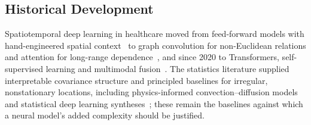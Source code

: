 \documentclass[journal]{IEEEtran}
\begin{document}
\subsection{Historical Development}

Spatiotemporal deep learning in healthcare moved from feed-forward models with hand-engineered spatial context~\cite{miotto2018deeplearning} to graph convolution for non-Euclidean relations and attention for long-range dependence~\cite{caroprese2018deepehr}, and since 2020 to Transformers, self-supervised learning and multimodal fusion~\cite{sun2026irregularmedical}. The statistics literature supplied interpretable covariance structure and principled baselines for irregular, nonstationary locations, including physics-informed convection--diffusion models and statistical deep learning syntheses~\cite{liu2022convectionDiffusion,wikle2023statisticalDeepLearning}; these remain the baselines against which a neural model's added complexity should be justified.
\end{document}
